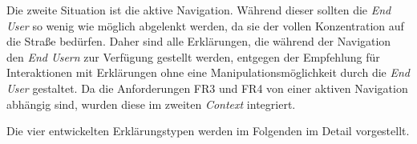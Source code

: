 Die zweite Situation ist die aktive Navigation. Während dieser sollten die \textit{End User} so wenig wie möglich abgelenkt werden, da sie der vollen Konzentration auf die Straße bedürfen. Daher sind alle Erklärungen, die während der Navigation den \textit{End Usern} zur Verfügung gestellt werden, entgegen der Empfehlung für Interaktionen mit Erklärungen ohne eine Manipulationsmöglichkeit durch die \textit{End User} gestaltet. Da die Anforderungen FR3 und FR4 von einer aktiven Navigation abhängig sind, wurden diese im zweiten \textit{Context} integriert.

Die vier entwickelten Erklärungstypen werden im Folgenden im Detail vorgestellt.







